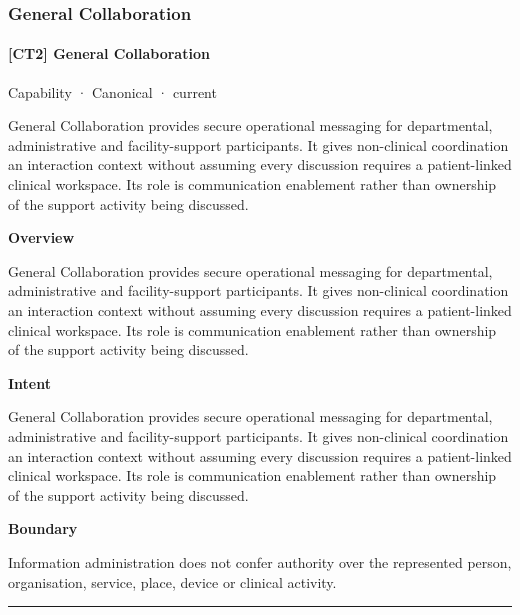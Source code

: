 \subsubsection{General Collaboration}

\paragraph{[CT2] General Collaboration}

\label{element:3bb740e6db284112b054905c0c6c80be}
{\small Capability · Canonical · current}\par

General Collaboration provides secure operational messaging for departmental, administrative and facility-support participants. It gives non-clinical coordination an interaction context without assuming every discussion requires a patient-linked clinical workspace. Its role is communication enablement rather than ownership of the support activity being discussed.



\textbf{Overview}



General Collaboration provides secure operational messaging for departmental, administrative and facility-support participants. It gives non-clinical coordination an interaction context without assuming every discussion requires a patient-linked clinical workspace. Its role is communication enablement rather than ownership of the support activity being discussed.



\textbf{Intent}



General Collaboration provides secure operational messaging for departmental, administrative and facility-support participants. It gives non-clinical coordination an interaction context without assuming every discussion requires a patient-linked clinical workspace. Its role is communication enablement rather than ownership of the support activity being discussed.



\textbf{Boundary}



Information administration does not confer authority over the represented person, organisation, service, place, device or clinical activity.



\medskip\hrule\medskip

